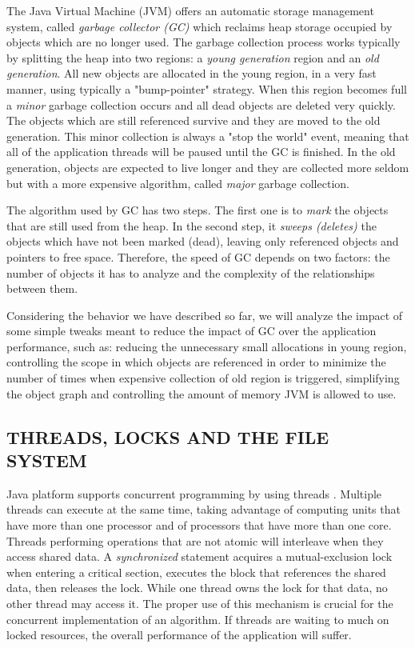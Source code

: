 \documentclass[a4paper,twoside]{article}
\begin{document}
The Java Virtual Machine (JVM) \cite{lindholm:2014} offers an automatic storage management system, called {\it garbage collector (GC)} which reclaims heap storage occupied by objects which are no longer used.
The garbage collection process \cite{gc:oracle} works typically by splitting the heap into two regions: a {\it young generation} region and an {\it old generation}.
All new objects are allocated in the young region, in a very fast manner, using typically a "bump-pointer" strategy. When this region becomes full  a {\it minor} garbage collection occurs and all dead objects are deleted very quickly. The objects which are still referenced survive and they  are moved to the old generation. This minor collection is always a "stop the world" event, meaning that all of the application threads will be paused until the GC is finished. 
In the old generation, objects are expected to live longer and they are collected more seldom but with a more expensive algorithm, called {\it major} garbage collection.

The algorithm used by GC has two steps. The first one is to {\it mark} the objects that are still used from the heap. In the second step, it {\it sweeps (deletes)} the objects which have not been marked (dead), leaving only referenced objects and pointers to free space. 
Therefore, the speed of GC depends on two factors: the number of objects it has to analyze and the complexity of the relationships between them. %

Considering the behavior we have described so far, we will analyze the impact of some simple tweaks
meant to reduce the impact of GC over the application performance, such as:
reducing the unnecessary small allocations in young region, controlling the scope in which objects are referenced in order to minimize the number of times when expensive collection of old region is triggered, simplifying the object graph and controlling the amount of memory JVM is allowed to use.


\subsection{\uppercase{Threads, Locks and the File System}}

Java platform supports concurrent programming by using threads \cite{gosling:2014}.
Multiple threads can execute at the same time, taking advantage of computing units that have more than one processor and of processors that have more than one core. Threads performing operations that are not atomic will interleave when they access shared data.
A {\it synchronized} statement acquires a mutual-exclusion lock when entering a critical section, executes the block that references the shared data, then releases the lock.
While one thread owns the lock for that data, no other thread may access it. 
The proper use of this mechanism is crucial for the concurrent implementation of an algorithm. If threads are waiting to much on locked resources, the overall performance of the application will suffer.
\end{document}
